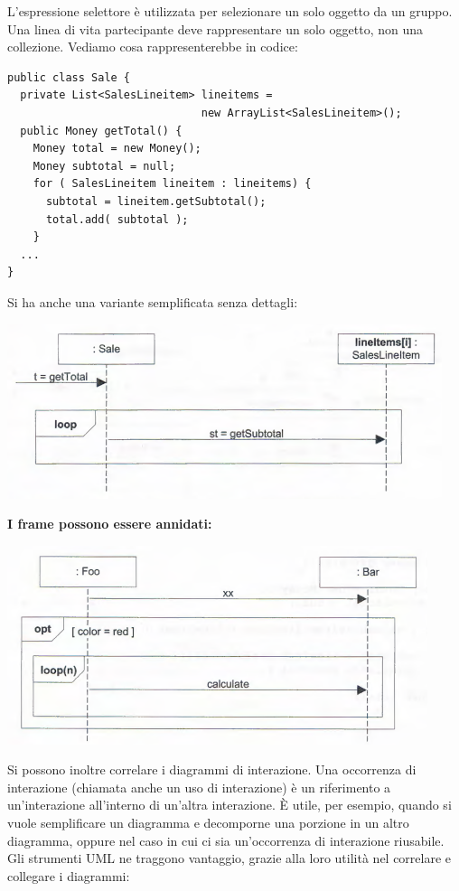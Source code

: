 \documentclass[a4paper,12pt, oneside]{book}
\begin{document}
L'espressione selettore è utilizzata per selezionare un solo oggetto da un gruppo. Una linea di vita
partecipante deve rappresentare un solo oggetto, non una collezione. Vediamo cosa rappresenterebbe in codice:
\begin{verbatim}
public class Sale {
  private List<SalesLineitem> lineitems =
                              new ArrayList<SalesLineitem>();
  public Money getTotal() {
    Money total = new Money();
    Money subtotal = null;
    for ( SalesLineitem lineitem : lineitems) {
      subtotal = lineitem.getSubtotal();
      total.add( subtotal );
    }
  ...
}
\end{verbatim}
Si ha anche una variante semplificata senza dettagli:
\begin{center}
	\includegraphics[scale=0.7]{img/iterd2.png}
\end{center}
\textbf{I frame possono essere annidati:}
\begin{center}
	\includegraphics[scale=0.7]{img/framed4.png}
\end{center}
Si possono inoltre correlare i diagrammi di interazione. Una occorrenza di interazione (chiamata anche un uso di interazione) è un riferimento a un'interazione all'interno di un'altra interazione. È utile, per esempio, quando si vuole semplificare un diagramma e decomporne una porzione in un altro diagramma, oppure nel caso in cui ci sia un'occorrenza di interazione riusabile. Gli strumenti UML ne traggono vantaggio, grazie alla loro utilità nel correlare e collegare i diagrammi:
\end{document}
